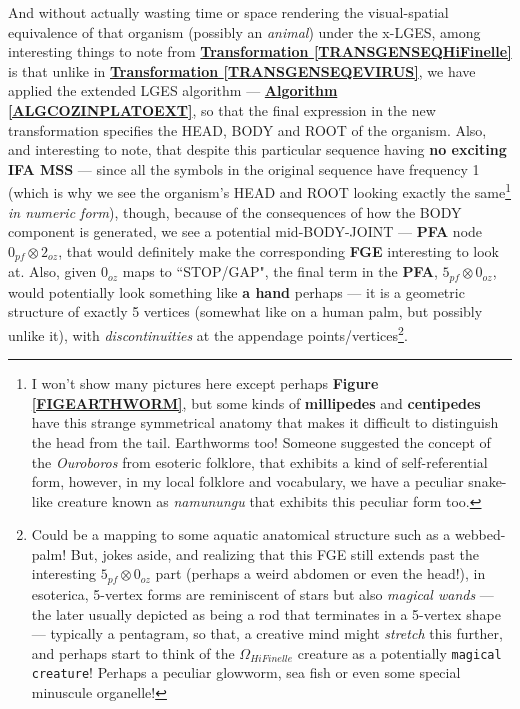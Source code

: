 \documentclass[a4paper, 18pt]{book} %
\begin{document}
And without actually wasting time or space rendering the visual-spatial equivalence of that organism (possibly an \textit{animal}) under the x-LGES, among interesting things to note from \textbf{\hyperref[TRANSGENSEQHiFinelle]{Transformation \ref{TRANSGENSEQHiFinelle}}} is that unlike in \textbf{\hyperref[TRANSGENSEQEVIRUS]{Transformation \ref{TRANSGENSEQEVIRUS}}}, we have applied the extended LGES algorithm --- \textbf{\hyperref[ALGCOZINPLATOEXT]{Algorithm \ref{ALGCOZINPLATOEXT}}}, so that the final expression in the new transformation specifies the HEAD, BODY and ROOT of the organism. Also, and interesting to note, that despite this particular sequence having \textbf{no exciting IFA MSS} --- since all the symbols in the original sequence have frequency 1 (which is why we see the organism's HEAD and ROOT looking exactly the same\footnote{I won't show many pictures here except perhaps \textbf{Figure \ref{FIGEARTHWORM}}, but some kinds of \textbf{millipedes} and \textbf{centipedes} have this strange symmetrical anatomy that makes it difficult to distinguish the head from the tail. Earthworms too! Someone suggested the concept of the \textit{Ouroboros} from esoteric folklore, that exhibits a kind of self-referential form, however, in my local folklore and vocabulary, we have a peculiar snake-like creature known as \textit{namunungu} that exhibits this peculiar form too.} \textit{in numeric form}), though, because of the consequences of how the BODY component is generated, we see a potential mid-BODY-JOINT --- \textbf{PFA} node $0_{pf} \otimes 2_{oz}$, that would definitely make the corresponding \textbf{FGE} interesting to look at. Also, given $0_{oz}$ maps to ``STOP/GAP", the final term in the \textbf{PFA}, $5_{pf} \otimes 0_{oz}$, would potentially look something like \textbf{a hand} perhaps --- it is a geometric structure of exactly 5 vertices (somewhat like on a human palm, but possibly unlike it), with \textit{discontinuities} at the appendage points/vertices\footnote{Could be a mapping to some aquatic anatomical structure such as a webbed-palm! But, jokes aside, and realizing that this FGE still extends past the interesting $5_{pf} \otimes 0_{oz}$ part (perhaps a weird abdomen or even the head!), in esoterica, 5-vertex forms are reminiscent of stars but also \textit{magical wands} --- the later usually depicted as being a rod that terminates in a 5-vertex shape --- typically a pentagram, so that, a creative mind might \textit{stretch} this further, and perhaps start to think of the $\Omega_{HiFinelle}$ creature as a potentially \texttt{magical creature}! Perhaps a peculiar glowworm, sea fish or even some special minuscule organelle!}. 
\end{document}
